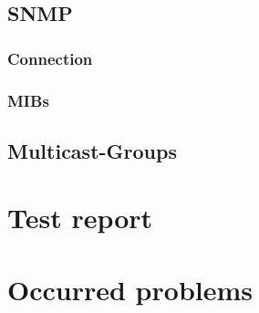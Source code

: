 \documentclass[11pt, a4paper]{article}
\begin{document}
\subsection{SNMP}
\subsubsection{Connection}
\subsubsection{MIBs}
\subsection{Multicast-Groups}

\section{Test report}
\section{Occurred problems}
{}

\end{document}
